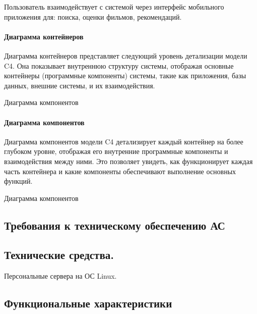 \clearpage

Пользователь взаимодействует с системой через интерфейс мобильного приложения для: поиска, оценки фильмов, рекомендаций.\par


\paragraph{Диаграмма контейнеров}

Диаграмма контейнеров представляет следующий уровень детализации модели C4.
Она показывает внутреннюю структуру системы,
отображая основные контейнеры (программные компоненты) системы,
такие как приложения, базы данных, внешние системы, и их взаимодействия.
   
\begin{image}
	\caption{Диаграмма компонентов}
	\label{fig:c4:container}
\end{image}

\clearpage

\paragraph{Диаграмма компонентов}

Диаграмма компонентов модели C4 детализирует
каждый контейнер на более глубоком уровне,
отображая его внутренние программные компоненты и взаимодействия между ними.
Это позволяет увидеть, как функционирует каждая часть контейнера
и какие компоненты обеспечивают выполнение основных функций.

\begin{image}
	\caption{Диаграмма компонентов}
	\label{fig:c4:components}
\end{image}

\clearpage

\subsection{Требования к техническому обеспечению АС}

\subsection*{Технические средства.}
Персональные сервера на ОС Linux.

\subsection*{Функциональные характеристики}


